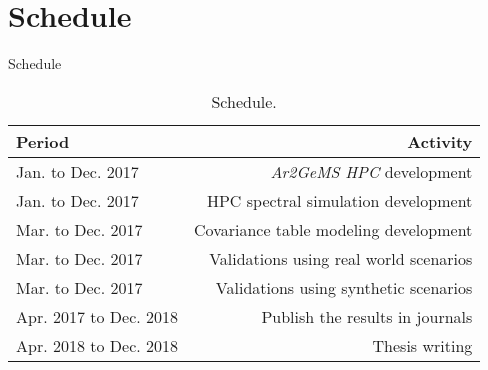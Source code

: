 \section{Schedule}
\begin{frame}{Schedule}

\centering
\begin{table}
\centering
\begin{tabular}{l|r}
Period & Activity \\\hline
Jan. to Dec. 2017 & \textit{Ar2GeMS HPC} development \\
Jan. to Dec. 2017 & HPC spectral simulation development \\
Mar. to Dec. 2017 & Covariance table modeling development \\
Mar. to Dec. 2017 & Validations using real world scenarios \\
Mar. to Dec. 2017 & Validations using synthetic scenarios \\
Apr. 2017 to Dec. 2018 & Publish the results in journals  \\
Apr. 2018 to Dec. 2018 & Thesis writing 
\end{tabular}
\caption{\label{tab:widgets}Schedule.}
\end{table}


\end{frame}